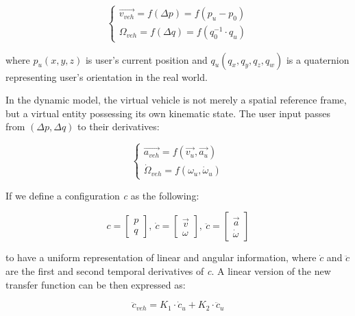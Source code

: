 \begin{equation}
\begin{cases}
\overrightarrow{v_{veh}}=f(\Delta p)=f(p_{u}-p_{0}) \\
\Omega_{veh}=f(\Delta q)=f(q_{0}^{-1} \cdot q_{u})
\end{cases}
\end{equation}

where $p_{u}(x,y,z)$ is user's current position and $q_{u}(q_{x},q_{y},q_{z},q_{w})$ is a quaternion representing user's orientation in the real world.

In the dynamic model, the virtual vehicle is not merely a spatial reference frame, but a virtual entity possessing its own kinematic state. The user input passes from $(\Delta p, \Delta q)$ to their derivatives: 

\begin{equation}
\begin{cases}
\overrightarrow{a_{veh}}=f(\overrightarrow{v_{u}}, \overrightarrow{a_{u}}) \\
\dot{\Omega}_{veh}=f(\omega_{u}, \dot{\omega}_{u})
\end{cases}
\end{equation}

If we define a configuration \textit{c} as the following:

\begin{equation}
c=
\begin{bmatrix}
p \\ q
\end{bmatrix},\:
\dot{c}=
\begin{bmatrix}
\overrightarrow{v} \\ \omega
\end{bmatrix},\:
\ddot{c}=
\begin{bmatrix}
\overrightarrow{a} \\ \dot{\omega}
\end{bmatrix}
\end{equation}

to have a uniform representation of linear and angular information, where $\dot{c}$ and $\ddot{c}$ are the first and second temporal derivatives of \textit{c}. A linear version of the new transfer function can be then expressed as:

\begin{equation}
\ddot{c}_{veh}=K_{1} \cdot \dot{c}_{u} + K_{2} \cdot \ddot{c}_{u}
\end{equation}

